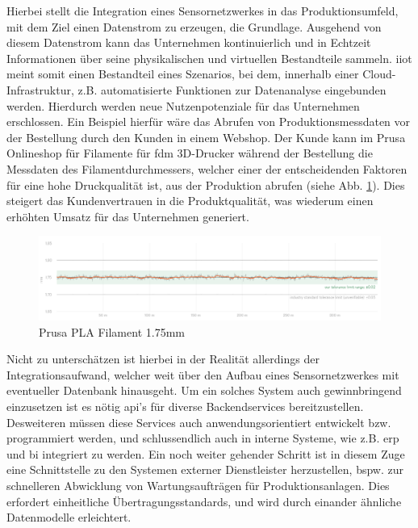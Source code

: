 Hierbei stellt die Integration eines Sensornetzwerkes in das Produktionsumfeld, mit dem Ziel einen Datenstrom zu erzeugen, die Grundlage. Ausgehend von diesem Datenstrom kann das Unternehmen kontinuierlich und in Echtzeit Informationen über seine physikalischen und virtuellen Bestandteile sammeln.
\ac{iiot} meint somit einen Bestandteil eines Szenarios, bei dem, innerhalb einer Cloud-Infrastruktur, z.B. automatisierte Funktionen zur Datenanalyse eingebunden werden. Hierdurch werden neue Nutzenpotenziale für das Unternehmen erschlossen. \cite{i40_instandhaltung}
Ein Beispiel hierfür wäre das Abrufen von Produktionsmessdaten vor der Bestellung durch den Kunden in einem Webshop. Der Kunde kann im Prusa Onlineshop für Filamente für \ac{fdm} 3D-Drucker während der Bestellung die Messdaten des Filamentdurchmessers, welcher einer der entscheidenden Faktoren für eine hohe Druckqualität ist, aus der Produktion abrufen (siehe Abb. \ref{fi:prusa}). Dies steigert das Kundenvertrauen in die Produktqualität, was wiederum einen erhöhten Umsatz für das Unternehmen generiert.
\begin{figure}[H]
    \begin{center}
        \includegraphics[width=\linewidth]{images/prusa.png}
        \caption[Prusament]{Prusa PLA Filament 1.75mm \cite*{prusa} }
        \label{fi:prusa}
    \end{center}
\end{figure}
Nicht zu unterschätzen ist hierbei in der Realität allerdings der Integrationsaufwand, welcher weit über den Aufbau eines Sensornetzwerkes mit eventueller Datenbank hinausgeht. Um ein solches System auch gewinnbringend einzusetzen ist es nötig \ac{api}'s für diverse Backendservices bereitzustellen. Desweiteren müssen diese Services auch anwendungsorientiert entwickelt bzw. programmiert werden, und schlussendlich auch in interne Systeme, wie z.B. \ac{erp} und \ac{bi} integriert zu werden.
Ein noch weiter gehender Schritt ist in diesem Zuge eine Schnittstelle zu den Systemen externer Dienstleister herzustellen, bspw. zur schnelleren Abwicklung von Wartungsaufträgen für Produktionsanlagen. Dies erfordert einheitliche Übertragungsstandards, und wird durch einander ähnliche Datenmodelle erleichtert.
